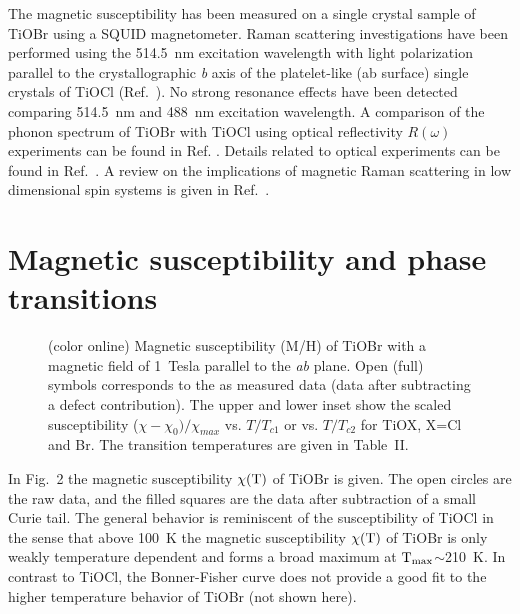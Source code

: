 \documentclass[prb,preprint,draft,amsmath,showpacs]{revtex4}
\begin{document}
The magnetic susceptibility has been measured on a single crystal sample of TiOBr using
a SQUID magnetometer. Raman scattering investigations have been performed using the
514.5~nm excitation wavelength with light polarization parallel to the crystallographic
\emph{b} axis of the platelet-like (ab surface) single crystals of TiOCl
(Ref.~). No strong resonance effects have been detected comparing
514.5~nm and 488~nm excitation wavelength. A comparison of the phonon spectrum of TiOBr
with TiOCl using optical reflectivity $R(\omega)$ experiments can be found in Ref.
. Details related to optical experiments can be found in
Ref.~. A review on the implications of magnetic Raman scattering in
low dimensional spin systems is given in Ref.~.



\section{Magnetic susceptibility and phase transitions}

\begin{figure}[t]
      \begin{center}
       \leavevmode
       \epsfxsize=9cm 
        \caption{(color online) Magnetic susceptibility (M/H) of TiOBr with
        a magnetic field of 1~Tesla parallel to the \emph{ab} plane.
        Open (full) symbols corresponds to the as measured data
        (data after subtracting a defect contribution). The upper and lower inset
        show the scaled susceptibility ($\chi-\chi_0)/\chi_{max}$ vs. $T/T_{c1}$ or vs. $T/T_{c2}$ for
        TiOX, X=Cl and Br. The transition temperatures are given in Table~II.}
\label{susceptibility}
\end{center}
\end{figure}

In Fig.~2 the magnetic susceptibility $\rm \chi(T)$ of TiOBr is given. The open circles
are the raw data, and the filled squares are the data after subtraction of a small Curie
tail. The general behavior is reminiscent of the susceptibility of TiOCl
\cite{seidel03,imai03} in the sense that above 100~K the magnetic susceptibility $\rm
\chi(T)$ of TiOBr is only weakly temperature dependent \cite{beyon93} and forms a broad
maximum at $\rm T_{max}$$\sim$210~K. In contrast to TiOCl, the Bonner-Fisher curve does
not provide a good fit to the higher temperature behavior of TiOBr (not shown here).
\end{document}
